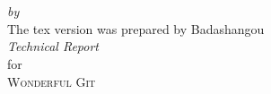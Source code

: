 \begin{titlepage}
  \vspace*{5cm}
  \makeatletter
  \begin{center}
    \begin{Huge}
      \@title
    \end{Huge}\\[0.1cm]
    \begin{Large}
      \@subtitle
    \end{Large}\\
    \emph{by}\\
    \@author
    \vfill
    The tex version was prepared by Badashangou\\
    \emph{Technical Report}\\
    for\\
    \textsc{Wonderful Git}
  \end{center}
  \makeatother
\end{titlepage}

\newpage
\null
\thispagestyle{empty}
\newpage
